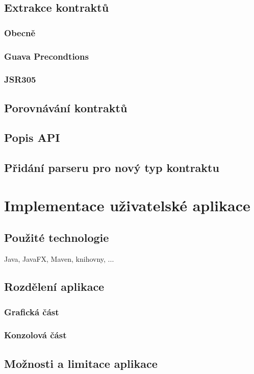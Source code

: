 		\subsection{Extrakce kontraktů}
			
			\subsubsection{Obecně}
			\subsubsection{Guava Precondtions}
			\subsubsection{JSR305}
		
	    \subsection{Porovnávání kontraktů}
	    
	    \subsection{Popis API}
	    
	    \subsection{Přidání parseru pro nový typ kontraktu}
    
	\section{Implementace uživatelské aplikace}
	   \subsection{Použité technologie}
	    	 Java, JavaFX, Maven, knihovny, ...	
	    	   
	   \subsection{Rozdělení aplikace}
	   		\subsubsection{Grafická část}
	   		\subsubsection{Konzolová část}
	   
	   \subsection{Možnosti a limitace aplikace}